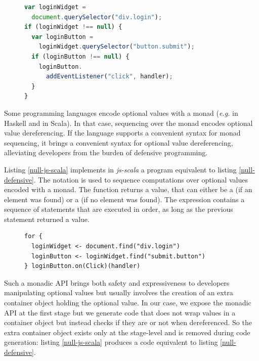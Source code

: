 \documentclass[preprint]{sigplanconf}
\newcommand{\eg}{\emph{e.g.}}
\begin{document}
\begin{figure}
\begin{lstlisting}[language=JavaScript,label=null-defensive,caption=Defensive programming to handle null references]
var loginWidget =
  document.querySelector("div.login");
if (loginWidget !== null) {
  var loginButton =
    loginWidget.querySelector("button.submit");
  if (loginButton !== null) {
    loginButton.
      addEventListener("click", handler);
  }
}
\end{lstlisting}
\end{figure}

Some programming languages encode optional values with a monad (\eg {} in Haskell and  in
Scala). In that case, sequencing over the monad encodes optional value dereferencing. If the language supports a
convenient syntax for monad sequencing, it brings a convenient syntax for optional value dereferencing, alleviating
developers from the burden of defensive programming.

Listing \ref{null-js-scala} implements in \emph{js-scala} a program equivalent to listing \ref{null-defensive}. The
 notation is used to sequence computations over optional values encoded with a monad. The 
function returns a  value, that can either be a  (if an element
was found) or a  (if no element was found). The  expression contains a sequence
of statements that are executed in order, as long as the previous statement returned a 
value.

\begin{figure}
\begin{lstlisting}[label=null-js-scala,caption=Handling null references in js-scala]
for {
  loginWidget <- document.find("div.login")
  loginButton <- loginWidget.find("submit.button")
} loginButton.on(Click)(handler)
\end{lstlisting}
\end{figure}

Such a monadic API brings both safety and expressiveness to developers manipulating optional values but usually
involves the creation of an extra container object holding the optional value. In our case, we expose
the monadic API at the first stage but we generate code that does not wrap values in a container object but instead
checks if they are  or not when dereferenced. So the extra container object exists only at the
stage-level and is removed during code generation: listing \ref{null-js-scala} produces a code equivalent to listing
\ref{null-defensive}.
\end{document}
